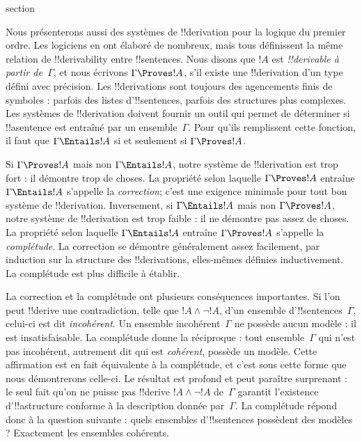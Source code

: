 \documentclass[11pt,a4paper,openany]{memoir}
\begin{document}
\endgroup



\begingroup
\expandafter\def\csname ol@sectioncs\endcsname{section}
\def\olfilename{soundness-completeness}




Nous présenterons aussi des systèmes de !!{derivation} pour la logique
du premier ordre. Les logiciens en ont élaboré de nombreux, mais tous
définissent la même relation de !!{derivability} entre
!!{sentence}s. Nous disons que $!A$ est \emph{!!{derivable} à partir
de~$\Gamma$}, et nous écrivons $\Gamma \Proves !A$, s'il existe une
!!{derivation} d'un type défini avec précision. Les
!!{derivation}s sont toujours des agencements finis de symboles :
parfois des listes d'!!{sentence}s, parfois des structures plus
complexes. Les systèmes de !!{derivation} doivent fournir un outil qui
permet de déterminer si !!a{sentence} est entraîné par un
ensemble~$\Gamma$. Pour qu'ils remplissent cette fonction, il faut que
$\Gamma \Entails !A$ si et seulement si $\Gamma \Proves !A$.

Si $\Gamma \Proves !A$ mais non $\Gamma \Entails !A$, notre système de
!!{derivation} est trop fort : il démontre trop de choses. La propriété
selon laquelle $\Gamma \Proves !A$ entraîne
$\Gamma \Entails !A$ s'appelle la \emph{correction}; c'est une exigence
minimale pour tout bon système de !!{derivation}. Inversement, si
$\Gamma \Entails !A$ mais non $\Gamma \Proves !A$, notre système de
!!{derivation} est trop faible : il ne démontre pas assez de choses. La
propriété selon laquelle $\Gamma \Entails !A$ entraîne
$\Gamma \Proves !A$ s'appelle la \emph{complétude}. La correction se
démontre généralement assez facilement, par induction sur la structure
des !!{derivation}s, elles-mêmes définies inductivement. La complétude
est plus difficile à établir.

La correction et la complétude ont plusieurs conséquences importantes.
Si l'on peut !!{derive} une contradiction, telle que
$!A \land \lnot !A$, d'un ensemble d'!!{sentence}s~$\Gamma$, celui-ci
est dit \emph{incohérent}. Un ensemble incohérent~$\Gamma$ ne possède
aucun modèle : il est insatisfaisable. La complétude donne la réciproque :
tout ensemble~$\Gamma$ qui n'est pas incohérent, autrement dit qui est
\emph{cohérent}, possède un modèle. Cette affirmation est en fait
équivalente à la complétude, et c'est sous cette forme que nous
démontrerons celle-ci. Le résultat est profond et peut paraître
surprenant : le seul fait qu'on ne puisse pas !!{derive}
$!A \land \lnot !A$ de~$\Gamma$ garantit l'existence
d'!!a{structure} conforme à la description donnée par~$\Gamma$. La
complétude répond donc à la question suivante : quels ensembles
d'!!{sentence}s possèdent des modèles ? Exactement les ensembles
cohérents.
\end{document}
